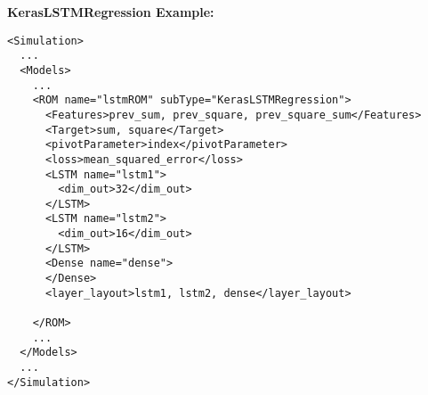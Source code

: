 \textbf{KerasLSTMRegression Example:}
\begin{lstlisting}[style=XML,morekeywords={name,subType}]
<Simulation>
  ...
  <Models>
    ...
    <ROM name="lstmROM" subType="KerasLSTMRegression">
      <Features>prev_sum, prev_square, prev_square_sum</Features>
      <Target>sum, square</Target>
      <pivotParameter>index</pivotParameter>
      <loss>mean_squared_error</loss>
      <LSTM name="lstm1">
        <dim_out>32</dim_out>
      </LSTM>
      <LSTM name="lstm2">
        <dim_out>16</dim_out>
      </LSTM>
      <Dense name="dense">
      </Dense>
      <layer_layout>lstm1, lstm2, dense</layer_layout>

    </ROM>
    ...
  </Models>
  ...
</Simulation>
\end{lstlisting}

